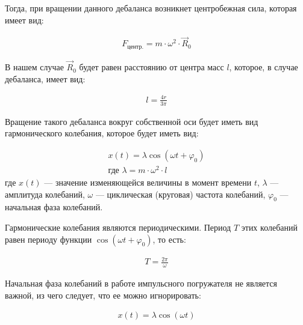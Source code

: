 Тогда, при вращении данного дебаланса возникнет центробежная сила, которая имеет вид:

\begin{equation}\label{eq:centrifugal}
    \begin{gathered}
        F_{\textrm{центр.}} = m \cdot \omega^2 \cdot \vec{R}_0
    \end{gathered}
\end{equation}

В нашем случае $\vec{R}_0$ будет равен расстоянию от центра масс $l$, которое, в случае дебаланса, имеет вид:

\begin{equation}\label{eq:distance_mass}
    \begin{gathered}
        l = \frac{4 r}{3 \pi}
    \end{gathered}
\end{equation}

Вращение такого дебаланса вокруг собственной оси будет иметь вид гармонического колебания, которое будет иметь вид:

\begin{equation}\label{eq:harmonic}
    \begin{gathered}
        x(t) = \lambda \cos (\omega t + \varphi_0) \\
        \textrm{где } \lambda = m \cdot \omega^2 \cdot l
    \end{gathered}
\end{equation}
\noindent где $x(t)$  — значение изменяющейся величины в момент времени $t$, $\lambda$ — амплитуда колебаний,
$\omega$ — циклическая (круговая) частота колебаний, $\varphi_0$ — начальная фаза колебаний.

Гармонические колебания являются периодическими. Период $T$ этих колебаний равен периоду функции $\cos (\omega t + \varphi_0)$, то есть:

\begin{equation*}
    \begin{aligned}
        T = \frac{2 \pi}{\omega}
    \end{aligned}
\end{equation*}

Начальная фаза колебаний в работе импульсного погружателя не является важной, из чего следует, что ее можно игнорировать:

\begin{equation}\label{eq:harmonic_notphi}
    \begin{aligned}
        x(t) = \lambda \cos (\omega t)
    \end{aligned}
\end{equation}

